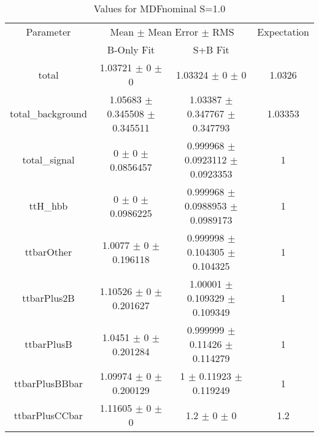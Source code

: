 \begin{table}
\centering
\caption{Values for MDFnominal S=1.0}
\begin{tabular}{cccc}
\toprule
Parameter & \multicolumn{2}{c}{Mean $\pm$ Mean Error $\pm$ RMS} & Expectation\\
 & B-Only Fit & S+B Fit & \\
\midrule
total & \num{1.03721} $\pm$ \num{0} $\pm$ \num{0} & \num{1.03324} $\pm$ \num{0} $\pm$ \num{0} & \num{1.0326}\\
total\_background & \num{1.05683} $\pm$ \num{0.345508} $\pm$ \num{0.345511} & \num{1.03387} $\pm$ \num{0.347767} $\pm$ \num{0.347793} & \num{1.03353}\\
total\_signal & \num{0} $\pm$ \num{0} $\pm$ \num{0.0856457} & \num{0.999968} $\pm$ \num{0.0923112} $\pm$ \num{0.0923353} & \num{1}\\
ttH\_hbb & \num{0} $\pm$ \num{0} $\pm$ \num{0.0986225} & \num{0.999968} $\pm$ \num{0.0988953} $\pm$ \num{0.0989173} & \num{1}\\
ttbarOther & \num{1.0077} $\pm$ \num{0} $\pm$ \num{0.196118} & \num{0.999998} $\pm$ \num{0.104305} $\pm$ \num{0.104325} & \num{1}\\
ttbarPlus2B & \num{1.10526} $\pm$ \num{0} $\pm$ \num{0.201627} & \num{1.00001} $\pm$ \num{0.109329} $\pm$ \num{0.109349} & \num{1}\\
ttbarPlusB & \num{1.0451} $\pm$ \num{0} $\pm$ \num{0.201284} & \num{0.999999} $\pm$ \num{0.11426} $\pm$ \num{0.114279} & \num{1}\\
ttbarPlusBBbar & \num{1.09974} $\pm$ \num{0} $\pm$ \num{0.200129} & \num{1} $\pm$ \num{0.11923} $\pm$ \num{0.119249} & \num{1}\\
ttbarPlusCCbar & \num{1.11605} $\pm$ \num{0} $\pm$ \num{0} & \num{1.2} $\pm$ \num{0} $\pm$ \num{0} & \num{1.2}\\
\bottomrule
\end{tabular}
\end{table}